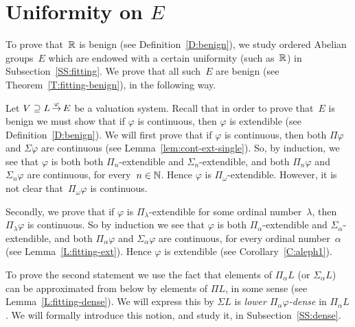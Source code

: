 \documentclass[main.tex]{subfiles}
\begin{document}
\section{Uniformity on $E$}
To prove that~$\mathbb{R}$
is benign (see Definition~\ref{D:benign}),
we study
ordered Abelian groups~$E$ which are endowed with
a certain uniformity (such as~$\mathbb{R}$)
in Subsection~\ref{SS:fitting}.
We prove that all such~$E$ are benign
(see Theorem~\ref{T:fitting-benign}),
in the following way.

Let $V \supseteq L\,\smash{\stackrel{\varphi}{\rightarrow}}\,E$ be a valuation system.
Recall that in order to prove that~$E$ is benign
 we must show that 
if $\varphi$ is continuous,
then $\varphi$ is extendible (see Definition~\ref{D:benign}).
We will first prove that
if $\varphi$ is continuous,
then both $\Pi \varphi$ and $\Sigma \varphi$ are continuous
(see Lemma~\ref{lem:cont-ext-single}).
So, by induction,
we see that $\varphi$ is
both both $\Pi_n$-extendible and $\Sigma_n$-extendible,
and both $\Pi_n\varphi$  and $\Sigma_n \varphi$
are continuous,
for every~$n\in \mathbb{N}$.
Hence $\varphi$ is $\Pi_\omega$-extendible.
However,
it is not clear that~$\Pi_\omega\varphi$
is continuous.

Secondly,
we prove that if 
$\varphi$ is $\Pi_\lambda$-extendible
for some ordinal number~$\lambda$,
then $\Pi_\lambda\varphi$ is continuous.
So by induction
we see that $\varphi$ is both $\Pi_\alpha$-extendible
and $\Sigma_\alpha$-extendible,
and both $\Pi_\alpha\varphi$ and $\Sigma_\alpha\varphi$
are continuous,
for every ordinal number~$\alpha$ 
(see Lemma~\ref{L:fitting-ext}).
Hence $\varphi$ is extendible
(see Corollary~\ref{C:aleph1}).

To prove the second statement
we use the fact that
elements of $\Pi_\alpha L$ (or $\Sigma_\alpha L$)
can be approximated from below
by elements of $\Pi L$, in some sense
(see Lemma~\ref{L:fitting-dense}).
We will express this by
$\Sigma L$ is \emph{lower $\Pi_\alpha \varphi$-dense}
in $\Pi_\alpha L$.
We will formally introduce this notion,
and study it, in Subsection~\ref{SS:dense}.
\end{document}
